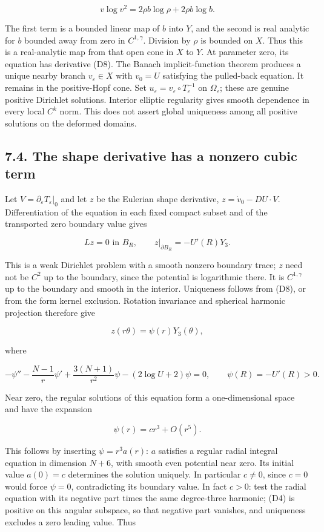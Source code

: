 \documentclass[11pt]{article}
\begin{document}
\[v\log v^2=2\rho b\log\rho+2\rho b\log b. \tag{D11}\]

The first term is a bounded linear map of \(b\) into \(Y\), and the
second is real analytic for \(b\) bounded away from zero in
\(C^{1,\gamma}\). Division by \(\rho\) is bounded on \(X\). Thus this is
a real-analytic map from that open cone in \(X\) to \(Y\). At parameter
zero, its equation has derivative (D8). The Banach implicit-function
theorem produces a unique nearby branch \(v_\varepsilon\in X\) with
\(v_0=U\) satisfying the pulled-back equation. It remains in the
positive-Hopf cone. Set
\(u_\varepsilon=v_\varepsilon\circ T_\varepsilon^{-1}\) on
\(\Omega_\varepsilon\); these are genuine positive Dirichlet solutions.
Interior elliptic regularity gives smooth dependence in every local
\(C^k\) norm. This does not assert global uniqueness among all positive
solutions on the deformed domains.

\subsection{7.4. The shape derivative has a nonzero cubic
term}\label{the-shape-derivative-has-a-nonzero-cubic-term}

Let \(V=\partial_\varepsilon T_\varepsilon|_0\) and let \(z\) be the
Eulerian shape derivative, \(z=\dot v_0-DU\cdot V\). Differentiation of
the equation in each fixed compact subset and of the transported zero
boundary value gives

\[Lz=0\text{ in }B_R,\qquad z|_{\partial B_R}=-U'(R)Y_3. \tag{D12}\]

This is a weak Dirichlet problem with a smooth nonzero boundary trace;
\(z\) need not be \(C^2\) up to the boundary, since the potential is
logarithmic there. It is \(C^{1,\gamma}\) up to the boundary and smooth
in the interior. Uniqueness follows from (D8), or from the form kernel
exclusion. Rotation invariance and spherical harmonic projection
therefore give

\[z(r\theta)=\psi(r)Y_3(\theta),\]

where

\[-\psi''-\frac{N-1}{r}\psi'+\frac{3(N+1)}{r^2}\psi
 -(2\log U+2)\psi=0,\qquad \psi(R)=-U'(R)>0. \tag{D13}\]

Near zero, the regular solutions of this equation form a one-dimensional
space and have the expansion

\[\psi(r)=c r^3+O(r^5). \tag{D14}\]

This follows by inserting \(\psi=r^3 a(r)\): \(a\) satisfies a regular
radial integral equation in dimension \(N+6\), with smooth even
potential near zero. Its initial value \(a(0)=c\) determines the
solution uniquely. In particular \(c\ne0\), since \(c=0\) would force
\(\psi=0\), contradicting its boundary value. In fact \(c>0\): test the
radial equation with its negative part times the same degree-three
harmonic; (D4) is positive on this angular subspace, so that negative
part vanishes, and uniqueness excludes a zero leading value. Thus
\end{document}
